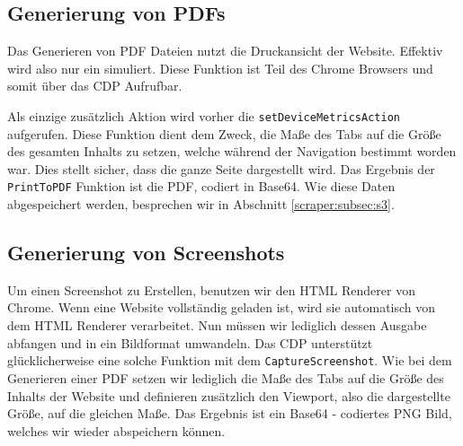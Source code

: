 \subsection{Generierung von PDFs} \label{scraper:subsec:go:pdf}
Das Generieren von PDF Dateien nutzt die Druckansicht der Website. Effektiv wird also nur ein  simuliert. Diese Funktion ist Teil des Chrome Browsers und somit über das CDP Aufrufbar.  
Als einzige zusätzlich Aktion wird vorher die \verb|setDeviceMetricsAction| aufgerufen. Diese Funktion dient dem Zweck, die Maße des Tabs auf die Größe des gesamten Inhalts zu setzen, welche während der Navigation bestimmt worden war. Dies stellt sicher, dass die ganze Seite dargestellt wird. Das Ergebnis der \verb|PrintToPDF| Funktion ist die PDF, codiert in Base64. Wie diese Daten abgespeichert werden, besprechen wir in Abschnitt \ref{scraper:subsec:s3}.
\subsection{Generierung von Screenshots} \label{scraper:subsec:go:screenshot}
Um einen Screenshot zu Erstellen, benutzen wir den HTML Renderer von Chrome. Wenn eine Website vollständig geladen ist, wird sie automatisch von dem HTML Renderer verarbeitet. Nun müssen wir lediglich dessen Ausgabe abfangen und in ein Bildformat umwandeln. Das CDP unterstützt glücklicherweise eine solche Funktion mit dem \verb|CaptureScreenshot|. Wie bei dem Generieren einer PDF setzen wir lediglich die Maße des Tabs auf die Größe des Inhalts der Website und definieren zusätzlich den Viewport, also die dargestellte Größe, auf die gleichen Maße. Das Ergebnis ist ein Base64 - codiertes PNG Bild, welches wir wieder abspeichern können.














